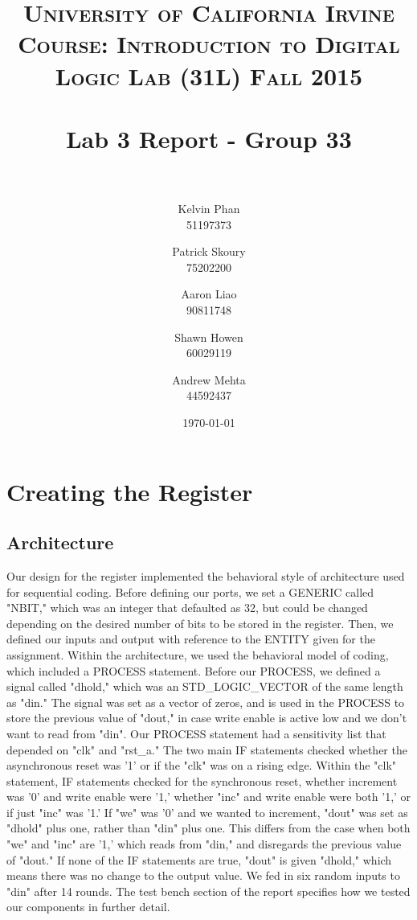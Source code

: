 \documentclass[paper=letter, fontsize=11pt]{scrartcl}
\title{	
\normalfont \normalsize 
\textsc{University of California Irvine} \\  %
\textsc{Course: Introduction to Digital Logic Lab (31L) Fall 2015} \\ [25pt]
\horrule{0.5pt} \\[0.4cm] %
\huge Lab 3 Report - Group 33\\ %
\horrule{2pt} \\[0.5cm] %
}
\author{Kelvin Phan \\ 51197373
	\and
	Patrick Skoury \\ 75202200
	\and
	Aaron Liao \\ 90811748
	\and
	Shawn Howen \\ 60029119
	\and
	Andrew Mehta \\ 44592437
}
\date{\large\today} %
\numberwithin{equation}{section} %
\numberwithin{figure}{section} %
\numberwithin{table}{section} %
\begin{document}
\maketitle %



\section{Creating the Register}

\subsection{Architecture}
\begin{flushleft}
	Our design for the register implemented the behavioral style of architecture used for sequential coding. Before defining our ports, we set a GENERIC called "NBIT," which was an integer that defaulted as 32, but could be changed depending on the desired number of bits to be stored in the register. Then, we defined our inputs and output with reference to the ENTITY given for the assignment. Within the architecture, we used the behavioral model of coding, which included a PROCESS statement. Before our PROCESS, we defined a signal called "dhold," which was an STD\_LOGIC\_VECTOR of the same length as "din." The signal was set as a vector of zeros, and is used in the PROCESS to store the previous value of "dout," in case write enable is active low and we don't want to read from "din". Our PROCESS statement had a sensitivity list that depended on "clk" and "rst\_a." The two main IF statements checked whether the asynchronous reset was '1' or if the "clk" was on a rising edge. Within the "clk" statement, IF statements checked for the synchronous reset, whether increment was '0' and write enable were '1,' whether "inc" and write enable were both '1,' or if just "inc" was '1.' If "we" was '0' and we wanted to increment, "dout" was set as "dhold" plus one, rather than "din" plus one. This differs from the case when both "we" and "inc" are '1,' which reads from "din," and disregards the previous value of "dout." If none of the IF statements are true, "dout" is given "dhold," which means there was no change to the output value. We fed in six random inputs to "din" after 14 rounds. The test bench section of the report specifies how we tested our components in further detail. \\[20pt]
\end{flushleft}
\end{document}
